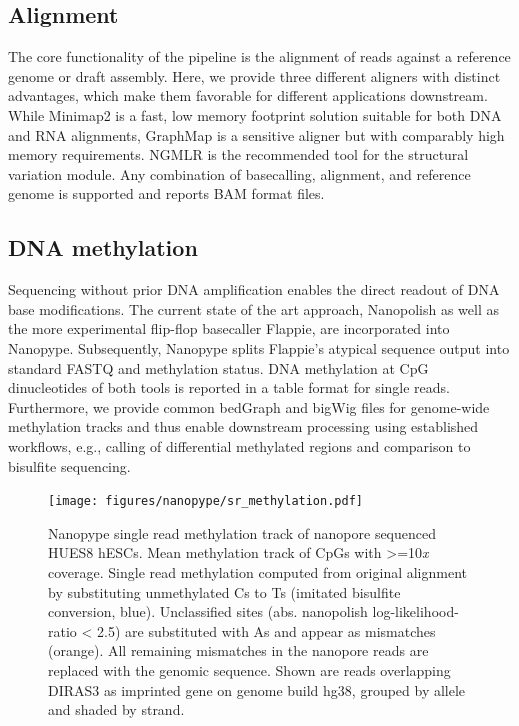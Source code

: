 \subsection{Alignment}
\label{subsec:nanopype:alignment}
The core functionality of the pipeline is the alignment of reads against a reference genome or draft assembly. Here, we provide three different aligners with distinct advantages, which make them favorable for different applications downstream. While Minimap2 \cite{Li2018} is a fast, low memory footprint solution suitable for both DNA and RNA alignments, GraphMap \cite{Sovic2016} is a sensitive aligner but with comparably high memory requirements. NGMLR \cite{Sedlazeck2018} is the recommended tool for the structural variation module. Any combination of basecalling, alignment, and reference genome is supported and reports BAM format files.


\subsection{DNA methylation}
\label{subsec:nanopype:methylation}
Sequencing without prior DNA amplification enables the direct readout of DNA base modifications. The current state of the art approach, Nanopolish \cite{Simpson2017} as well as the more experimental flip-flop basecaller Flappie, are incorporated into Nanopype. Subsequently, Nanopype splits Flappie’s atypical sequence output into standard FASTQ and methylation status. DNA methylation at CpG dinucleotides of both tools is reported in a table format for single reads. Furthermore, we provide common bedGraph and bigWig files for genome-wide methylation tracks and thus enable downstream processing using established workflows, e.g., calling of differential methylated regions and comparison to bisulfite sequencing.

\begin{figure}[h]
	\centering
	\texttt{[image: figures/nanopype/sr\_methylation.pdf]}
	\captionsetup{format=plain}
	\caption[Nanopype single read methylation track]{Nanopype single read methylation track of nanopore sequenced HUES8 hESCs. Mean methylation track of CpGs with >=10\textit{x} coverage. Single read methylation computed from original alignment by substituting unmethylated Cs to Ts (imitated bisulfite conversion, blue). Unclassified sites (abs. nanopolish log-likelihood-ratio < 2.5) are substituted with As and appear as mismatches (orange). All remaining mismatches in the nanopore reads are replaced with the genomic sequence. Shown are reads overlapping DIRAS3 as imprinted gene on genome build hg38, grouped by allele and shaded by strand.}
	\label{fig:nanopype:sr_methylation}
\end{figure}


